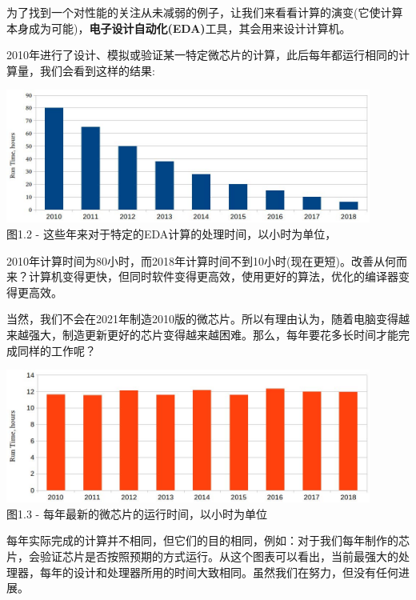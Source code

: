 
为了找到一个对性能的关注从未减弱的例子，让我们来看看计算的演变(它使计算本身成为可能)，\textbf{电子设计自动化(EDA)}工具，其会用来设计计算机。

2010年进行了设计、模拟或验证某一特定微芯片的计算，此后每年都运行相同的计算量，我们会看到这样的结果:

\begin{center}
\includegraphics[width=0.9\textwidth]{content/1/chapter1/images/2.jpg}\\
图1.2 - 这些年来对于特定的EDA计算的处理时间，以小时为单位，
\end{center}

2010年计算时间为80小时，而2018年计算时间不到10小时(现在更短)。改善从何而来？计算机变得更快，但同时软件变得更高效，使用更好的算法，优化的编译器变得更高效。

当然，我们不会在2021年制造2010版的微芯片。所以有理由认为，随着电脑变得越来越强大，制造更新更好的芯片变得越来越困难。那么，每年要花多长时间才能完成同样的工作呢？

\begin{center}
\includegraphics[width=0.9\textwidth]{content/1/chapter1/images/3.jpg}\\
图1.3 - 每年最新的微芯片的运行时间，以小时为单位
\end{center}

每年实际完成的计算并不相同，但它们的目的相同，例如：对于我们每年制作的芯片，会验证芯片是否按照预期的方式运行。从这个图表可以看出，当前最强大的处理器，每年的设计和处理器所用的时间大致相同。虽然我们在努力，但没有任何进展。

